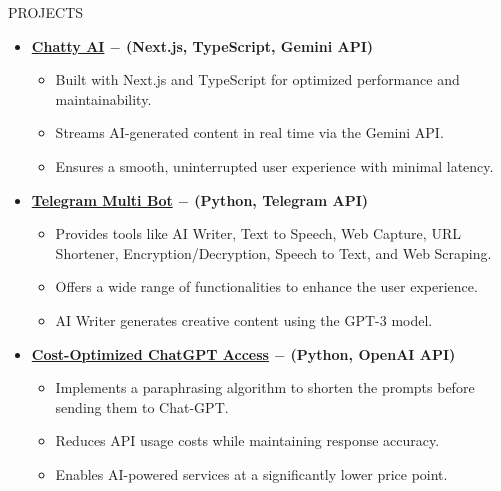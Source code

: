 \documentclass{resume} %
\begin{document}
\begin{rSection}{PROJECTS}
\vspace{0.6em}

\begin{itemize}
\item \textbf{\href{https://github.com/jackwaghan/Chatty-AI}{Chatty AI} \(-\) (Next.js, TypeScript, Gemini API)}  
    \begin{itemize}
        \item Built with Next.js and TypeScript for optimized performance and maintainability.  
        \item Streams AI-generated content in real time via the Gemini API.  
        \item Ensures a smooth, uninterrupted user experience with minimal latency.  
    \end{itemize}  

\item \textbf{\href{https://github.com/jackwaghan/Telegram-Multi-Bot}{Telegram Multi Bot} \(-\) (Python, Telegram API)}  
    \begin{itemize}
        \item Provides tools like AI Writer, Text to Speech, Web Capture, URL Shortener, Encryption/Decryption, Speech to Text, and Web Scraping.  
        \item Offers a wide range of functionalities to enhance the user experience.
        \item AI Writer generates creative content using the GPT-3 model.
    \end{itemize}  

\item \textbf{\href{https://github.com/jackwaghan/ChatGPT-AT-Low-Cost}{Cost-Optimized ChatGPT Access} \(-\) (Python, OpenAI API)}
    \begin{itemize}
        \item Implements a paraphrasing algorithm to shorten the prompts before sending them to Chat-GPT.  
        \item Reduces API usage costs while maintaining response accuracy.  
        \item Enables AI-powered services at a significantly lower price point.  
    \end{itemize}  
\end{itemize}

\end{rSection}

\end{document}
